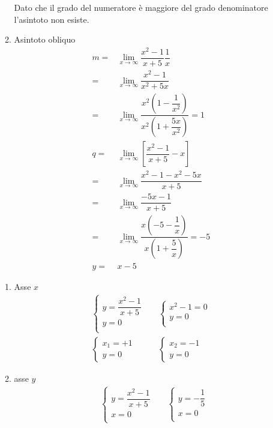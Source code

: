\begin{exercise}
\begin{itemize}
\begin{enumerate}
			Dato che il grado del  numeratore è maggiore del grado denominatore l'asintoto non esiste.
			\item Asintoto obliquo
			\begin{align*}
			m=&\lim_{x\to \infty}\dfrac{x^2-1}{x+5}\dfrac{1}{x}\\
			=&\lim_{x\to \infty}\dfrac{x^2-1}{x^2+5x}\\
			=&\lim_{x\to \infty}\dfrac{x^2\left(1-\dfrac{1}{x^2}\right)}{x^2\left(1+\dfrac{5x}{x^2}\right)}=1\\
			q=&\lim_{x\to \infty}[\dfrac{x^2-1}{x+5}-x]\\
			=&\lim_{x\to \infty}\dfrac{x^2-1-x^2-5x}{x+5}\\
			=&\lim_{x\to \infty}\dfrac{-5x-1}{x+5}\\
			=&\lim_{x\to \infty}\dfrac{x\left(-5-\dfrac{1}{x}\right)}{x\left(1+\dfrac{5}{x}\right)}=-5\\
			y=&x-5
			\end{align*}
		\end{enumerate}
	\begin{enumerate}
		\item Asse $x$
	\begin{align*}
		&\begin{cases}
	y=\dfrac{x^2-1}{x+5}\\
	y=0\\
	\end{cases}&
		&\begin{cases}
	x^2-1=0\\
	y=0\\
	\end{cases}\\
		&\begin{cases}
	x_1=+1\\
	y=0
	\end{cases}&
		&\begin{cases}
	x_2=-1\\
	y=0
	\end{cases}&
	\end{align*}
		\item asse $y$
			\begin{align*}
		&\begin{cases}
		y=\dfrac{x^2-1}{x+5}\\
		x=0\\
		\end{cases}&
		&\begin{cases}
		y=-\dfrac{1}{5}\\
		x=0\\

\end{cases}
\end{align*}
\end{enumerate}
\end{itemize}
\end{exercise}

